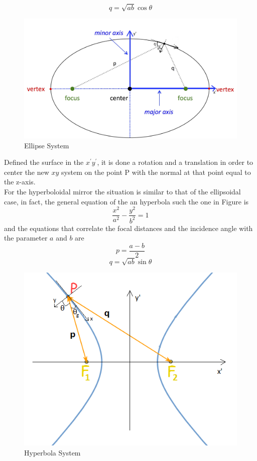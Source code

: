%
\begin{equation}
q = \sqrt{ab} \cos\theta
\label{eq: 2ndEllipseEq}
\end{equation}
%
\begin{figure}[H]
%
\centering
%
\includegraphics[width=.8\textwidth]{Immagini/Chapter3/EllipseSystem3}
%
\caption{Ellipse System}
%
\label{fig: ellipse}
%
\end{figure}
%
Defined the surface in the $x^{'}y^{'} $, it is done a rotation and a translation in order to center the new $xy $ system on the point P with the normal at that point equal to the z-axis.
\\
For the hyperboloidal mirror the situation is similar to that of the ellipsoidal case, in fact, the general equation of the an hyperbola such the one in Figure is 
%
\begin{equation}
\frac{x^2}{a^2} - \frac{y^2}{b^2} = 1
\end{equation}
%
and the equations that correlate the focal distances and the incidence angle with the parameter $a $ and $b $ are
%
\begin{equation}
p = \frac{a - b}{2}
\label{eq: 1stHypEq}
\end{equation}
%
\begin{equation}
q = \sqrt{ab} \sin\theta
\label{eq: 2ndHypEq}
\end{equation}
%
\begin{figure}[H]
%
\centering
%
\includegraphics[width=.5\textwidth]{Immagini/Chapter3/Hyperbola}
%
\caption{Hyperbola System}
%
\label{fig: hyperbola}
%
\end{figure}
